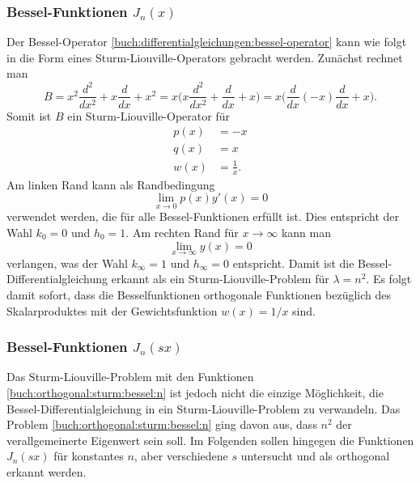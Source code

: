 %
%
\subsubsection{Bessel-Funktionen $J_n(x)$}
Der Bessel-Operator \eqref{buch:differentialgleichungen:bessel-operator}
kann wie folgt in die Form eines Sturm-Liouville-Operators gebracht 
werden.
Zunächst rechnet man
\[
B
=
x^2\frac{d^2}{dx^2} + x\frac{d}{dx} + x^2
=
x\biggl(
x\frac{d^2}{dx^2} + \frac{d}{dx} + x
\biggr)
=
x\biggl(
\frac{d}{dx}(-x)\frac{d}{dx} + x
\biggr).
\]
Somit ist $B$ ein Sturm-Liouville-Operator für 
\begin{equation}
\begin{aligned}
p(x) &= -x \\
q(x) &= x \\
w(x) &= \frac{1}{x}.
\end{aligned}
\label{buch:orthogonal:sturm:bessel:n}
\end{equation}
Am linken Rand kann als Randbedingung 
\[
\lim_{x\to 0} p(x) y'(x) = 0
\]
verwendet werden, die für alle Bessel-Funktionen erfüllt ist.
Dies entspricht der Wahl $k_0=0$ und $h_0=1$.
Am rechten Rand für $x\to\infty$ kann man
\[
\lim_{x\to\infty} y(x)=0
\]
verlangen, was der Wahl $k_\infty=1$ und $h_\infty=0$ entspricht.
Damit ist die Bessel-Differentialgleichung erkannt als ein
Sturm-Liouville-Problem für $\lambda=n^2$.
Es folgt damit sofort, dass die Besselfunktionen orthogonale
Funktionen bezüglich des Skalarproduktes mit der Gewichtsfunktion
$w(x)=1/x$ sind.

%
%
\subsubsection{Bessel-Funktionen $J_n(s x)$}
Das Sturm-Liouville-Problem mit den Funktionen
\eqref{buch:orthogonal:sturm:bessel:n}
ist jedoch nicht die einzige Möglichkeit, die Bessel-Differentialgleichung
in ein Sturm-Liouville-Problem zu verwandeln.
Das Problem \eqref{buch:orthogonal:sturm:bessel:n} ging davon
aus, dass $n^2$ der verallgemeinerte Eigenwert sein soll.
Im Folgenden sollen hingegen die Funktionen $J_n(s x)$ für
konstantes $n$, aber verschiedene $s$ untersucht und
als orthogonal erkannt werden.

